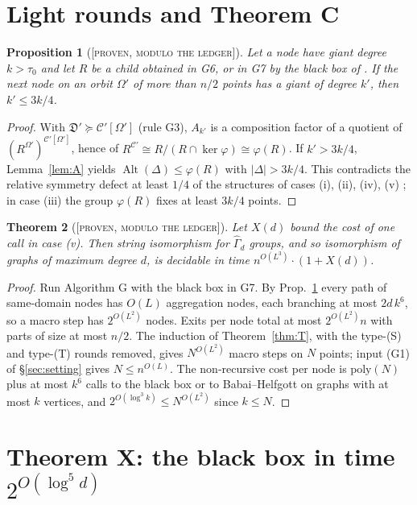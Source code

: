 \documentclass[11pt]{article}
\newtheorem{theorem}{Theorem}[section]
\newtheorem{proposition}[theorem]{Proposition}
\theoremstyle{definition}
\theoremstyle{remark}
\newcommand{\Alt}{\operatorname{Alt}}
\newcommand{\C}{\mathcal C}
\newcommand{\fD}{\mathfrak D}
\newcommand{\Gammahat}{\widehat\Gamma}
\newcommand{\ProvenM}{\textsc{[proven, modulo the ledger]}}
\begin{document}
\section{Light rounds and Theorem C}\label{sec:light}

\begin{proposition}[\ProvenM]\label{prop:k}
Let a node have giant degree $k>\tau_0$ and let $R$ be a child obtained in \textup{G6}, or in \textup{G7} by the black box of \cite[Lemma~6.7]{GNS}. If the next node on an orbit $\Omega'$ of more than $n/2$ points has a giant of degree $k'$, then $k'\le 3k/4$.
\end{proposition}
\begin{proof}
With $\fD'\succeq\C'[\Omega']$ (rule G3), $A_{k'}$ is a composition factor of a quotient of $(R^{\Omega'})^{\C'[\Omega']}$, hence of $R^{\C'}\cong R/(R\cap\ker\varphi)\cong\varphi(R)$. If $k'>3k/4$, Lemma~\ref{lem:A} yields $\Alt(\Delta)\le\varphi(R)$ with $|\Delta|>3k/4$. This contradicts the relative symmetry defect at least $1/4$ of the structures of cases (i), (ii), (iv), (v) \cite[Lemma~6.6]{GNS}; in case (iii) the group $\varphi(R)$ fixes at least $3k/4$ points.
\end{proof}

\begin{theorem}[\ProvenM]\label{thm:C}
Let $X(d)$ bound the cost of one call in case \textup{(v)}. Then string isomorphism for $\Gammahat_d$ groups, and so isomorphism of graphs of maximum degree $d$, is decidable in time $n^{O(L^3)}\cdot(1+X(d))$.
\end{theorem}
\begin{proof}
Run Algorithm G with the black box in G7. By Prop.~\ref{prop:k} every path of same-domain nodes has $O(L)$ aggregation nodes, each branching at most $2d\,k^6$, so a macro step has $2^{O(L^2)}$ nodes. Exits per node total at most $2^{O(L^2)}n$ with parts of size at most $n/2$. The induction of Theorem~\ref{thm:T}, with the type-(S) and type-(T) rounds removed, gives $N^{O(L^2)}$ macro steps on $N$ points; input (G1) of \S\ref{sec:setting} gives $N\le n^{O(L)}$. The non-recursive cost per node is $\mathrm{poly}(N)$ plus at most $k^6$ calls to the black box or to Babai--Helfgott on graphs with at most $k$ vertices, and $2^{O(\log^3 k)}\le N^{O(L^2)}$ since $k\le N$.
\end{proof}

\section{Theorem X: the black box in time $2^{O(\log^5 d)}$}\label{sec:X}
\end{document}
